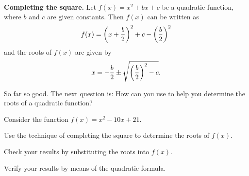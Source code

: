 \documentclass[a4paper,oneside,12pt]{article}
\begin{document}
\begin{theorem}
\label{thm:monic_quadratic_roots}
\textbf{Completing the square.}
Let $f(x) = x^2 + bx + c$ be a quadratic function, where $b$ and $c$
are given constants.  Then $f(x)$ can be written as
\[
f(x)
=
\parenthesis*{x + \frac{b}{2}}^2
+
c
-
\parenthesis*{\frac{b}{2}}^2
\]
and the roots of $f(x)$ are given by
\[
x
=
-\frac{b}{2}
\pm
\sqrt{
  \parenthesis*{\frac{b}{2}}^2 - c
}.
\]
\end{theorem}

So far so good.  The next question is: How can you use
 to help you determine the roots of
a quadratic function?

\begin{example}
\label{eg:completing_square_monic_bminus10_c21}
Consider the function $f(x) = x^2 - 10x + 21$.
\begin{packedenum}
\item\label{subeg:completing_square_roots_a1_bminus10_c21}
  Use the technique of completing the square to determine the roots of
  $f(x)$.

\item\label{subeg:completing_square_verify_substitution_a1_bminus10_c21}
  Check your results by substituting the roots into $f(x)$.

\item\label{subeg:completing_square_verify_quadform_a1_bminus10_c21}
  Verify your results by means of the quadratic formula.
\end{packedenum}
\end{example}
\end{document}
